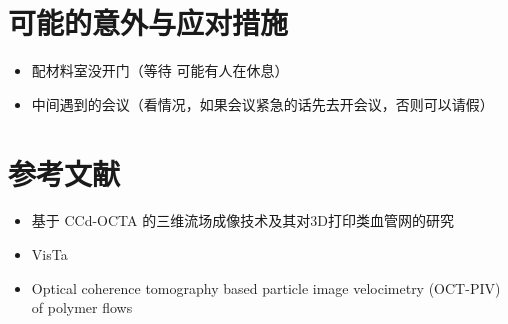\documentclass[12pt]{article}
\begin{document}
\section{可能的意外与应对措施}
\begin{itemize}

    \item 配材料室没开门（等待 可能有人在休息）
    \item 中间遇到的会议（看情况，如果会议紧急的话先去开会议，否则可以请假）
\end{itemize}

\section{参考文献}

\begin{itemize}
    \item 基于 CCd-OCTA 的三维流场成像技术及其对3D打印类血管网的研究 
    \item VisTa
    \item Optical coherence tomography based particle image velocimetry (OCT-PIV) of polymer flows
\end{itemize}
\end{document}
